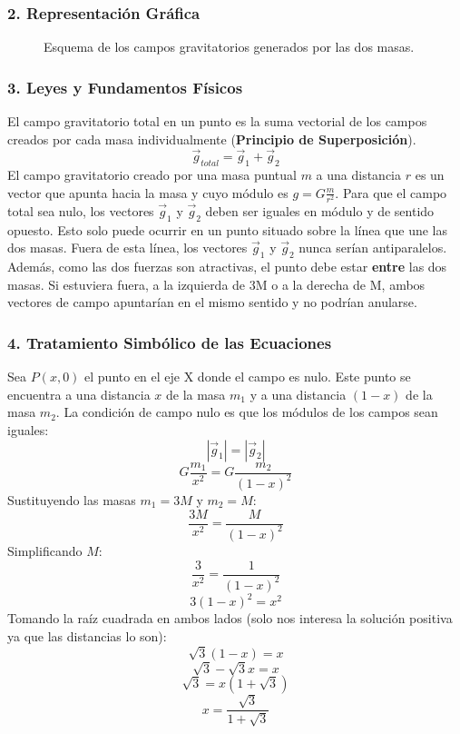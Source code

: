\subsubsection*{2. Representación Gráfica}
\begin{figure}[H]
    \centering
    \caption{Esquema de los campos gravitatorios generados por las dos masas.}
\end{figure}

\subsubsection*{3. Leyes y Fundamentos Físicos}
El campo gravitatorio total en un punto es la suma vectorial de los campos creados por cada masa individualmente (\textbf{Principio de Superposición}).
$$\vec{g}_{total} = \vec{g}_1 + \vec{g}_2$$
El campo gravitatorio creado por una masa puntual $m$ a una distancia $r$ es un vector que apunta hacia la masa y cuyo módulo es $g = G\frac{m}{r^2}$.
Para que el campo total sea nulo, los vectores $\vec{g}_1$ y $\vec{g}_2$ deben ser iguales en módulo y de sentido opuesto. Esto solo puede ocurrir en un punto situado sobre la línea que une las dos masas. Fuera de esta línea, los vectores $\vec{g}_1$ y $\vec{g}_2$ nunca serían antiparalelos.
Además, como las dos fuerzas son atractivas, el punto debe estar \textbf{entre} las dos masas. Si estuviera fuera, a la izquierda de 3M o a la derecha de M, ambos vectores de campo apuntarían en el mismo sentido y no podrían anularse.

\subsubsection*{4. Tratamiento Simbólico de las Ecuaciones}
Sea $P(x,0)$ el punto en el eje X donde el campo es nulo. Este punto se encuentra a una distancia $x$ de la masa $m_1$ y a una distancia $(1-x)$ de la masa $m_2$.
La condición de campo nulo es que los módulos de los campos sean iguales:
$$|\vec{g}_1| = |\vec{g}_2|$$
$$G\frac{m_1}{x^2} = G\frac{m_2}{(1-x)^2}$$
Sustituyendo las masas $m_1=3M$ y $m_2=M$:
$$\frac{3M}{x^2} = \frac{M}{(1-x)^2}$$
Simplificando $M$:
$$\frac{3}{x^2} = \frac{1}{(1-x)^2}$$
$$3(1-x)^2 = x^2$$
Tomando la raíz cuadrada en ambos lados (solo nos interesa la solución positiva ya que las distancias lo son):
$$\sqrt{3}(1-x) = x$$
$$\sqrt{3} - \sqrt{3}x = x$$
$$\sqrt{3} = x(1+\sqrt{3})$$
$$x = \frac{\sqrt{3}}{1+\sqrt{3}}$$


